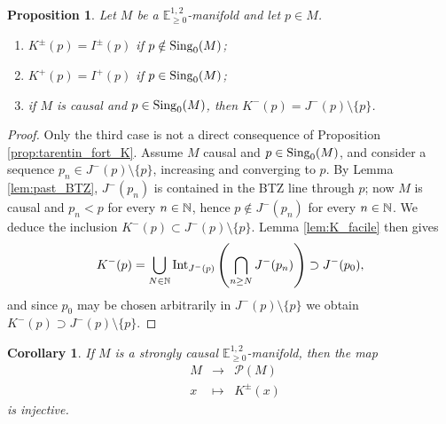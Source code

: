 \documentclass[a4paper,twoside]{article}
\newcommand{\fonctionn}[4]{
	\displaystyle\begin{array}{l|rcl}
	& \displaystyle #1 & \longrightarrow & \displaystyle #2 \\
    & \displaystyle #3 & \longmapsto & \displaystyle #4 \end{array}
}
\newcommand{\mass}[1]{\mathbb{E}^{1,2}_{#1}}
\newtheorem{cor}[lem]{Corollary}
\newtheorem{prop}[lem]{Proposition}
\begin{document}
\begin{prop}\label{prop:K_calcul} Let $M$ be a $\mass{\geq 0}$-manifold and let $p\in M$.
\begin{enumerate}[label=(\alph*)]
\item $K^\pm(p)=I^\pm(p)$ if $p\notin \mathrm{Sing}_0(M)$;
\item $K^+(p)=I^+(p)$ if $p\in \mathrm{Sing}_0(M)$;
\item if $M$ is causal and $p\in \mathrm{Sing}_0(M)$, then $K^-(p)=J^-(p)\setminus \{p\}$.
\end{enumerate}
\end{prop}
\begin{proof}
Only the third case is not a direct consequence of Proposition \ref{prop:tarentin_fort_K}.
Assume $M$ causal and $p\in \mathrm{Sing}_0(M)$, and
consider a sequence $p_n\in J^-(p)\setminus \{p\}$, increasing and converging to $p$.
By Lemma \ref{lem:past_BTZ}, $J^-(p_n)$ is contained in the BTZ line through $p$; now
$M$ is causal and $p_n< p$ for every $n\in \mathbb{N}$, hence $p \notin J^-(p_n)$ for every $n\in \mathbb{N}$. We deduce the inclusion
$K^-(p)\subset J^-(p)\setminus \{p\}$. Lemma \ref{lem:K_facile} then gives
$$K^-(p)=\bigcup_{N\in \mathbb{N}} \mathrm{Int}_{J^-(p)}\left(\bigcap_{n\geq N} J^-(p_n)\right)\supset J^-(p_0),$$
and since $p_0$ may be chosen arbitrarily in $J^-(p)\setminus \{p\}$ we obtain
$K^-(p)\supset J^-(p)\setminus \{p\}$.
\end{proof}
\begin{cor}\label{cor:K_injectif} If $M$ is a strongly causal $\mass{\geq 0}$-manifold, then
the map
$$\fonctionn{M}{\mathcal P(M)}{x}{K^\pm(x)}$$
is injective.
\end{cor}
\end{document}
